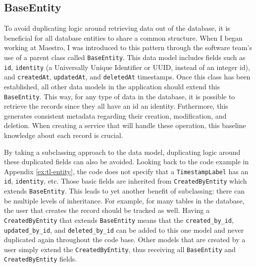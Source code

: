 \subsection{BaseEntity}

To avoid duplicating logic around retrieving data out of the database, it is beneficial for all database entities to share a common structure.  When I began working at Maestro, I was introduced to this pattern through the software team's use of a parent class called \verb!BaseEntity!.  This data model includes fields such as \verb!id!, \verb!identity! (a Universally Unique Identifier or UUID, instead of an integer id), and \verb!createdAt!, \verb!updatedAt!, and \verb!deletedAt! timestamps.  Once this class has been established, all other data models in the application should extend this \verb!BaseEntity!.  This way, for any type of data in the database, it is possible to retrieve the records since they all have an id an identity. Futhermore, this generates consistent metadata regarding their creation, modification, and deletion. When creating a service that will handle these operation, this baseline knowledge about each record is crucial.

By taking a subclassing approach to the data model, duplicating logic around these duplicated fields can also be avoided.  Looking back to the code example in Appendix \ref{ex:tl-entity}, the code does not specify that a \verb!TimestampLabel! has an \verb!id!, \verb!identity!, etc. Those basic fields are inherited from \verb!CreatedByEntity! which extends \verb!BaseEntity!.  This leads to yet another benefit of subclassing: there can be multiple levels of inheritance. For example, for many tables in the database, the user that creates the record should be tracked as well.  Having a \verb!CreatedByEntity! that extends \verb!BaseEntity! means that the \verb!created_by_id!, \verb!updated_by_id!, and \verb!deleted_by_id! can be added to this one model and never duplicated again throughout the code base.  Other models that are created by a user simply extend the \verb!CreatedByEntity!, thus receiving all \verb!BaseEntity! and \verb!CreatedByEntity! fields.